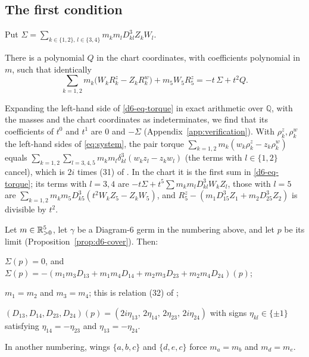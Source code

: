 \subsection{The first condition}

Put $\Sigma=\sum_{k\in\{1,2\},\,l\in\{3,4\}}m_km_lD_{kl}^3Z_kW_l$.

\begin{lemma}\label{d6-lem-torque}
There is a polynomial $Q$ in the chart coordinates, with coefficients polynomial in $m$, such
that identically
\begin{equation}\label{d6-eq-torque}
  \sum_{k=1,2}m_k\bigl(W_kR^z_k-Z_kR^w_k\bigr)+m_5W_5R^z_5=-t\,\Sigma+t^2Q.
\end{equation}
\end{lemma}
Expanding the left-hand side of \eqref{d6-eq-torque} in exact arithmetic over $\mathbb Q$, with
the masses and the chart coordinates as indeterminates, we find that its coefficients of $t^0$
and $t^1$ are $0$ and $-\Sigma$ (Appendix~\ref{app:verification}).
With $\rho^z_k,\rho^w_k$ the left-hand sides of \eqref{eq:system}, the pair torque
$\sum_{k=1,2}m_k(w_k\rho^z_k-z_k\rho^w_k)$ equals
$\sum_{k=1,2}\sum_{l=3,4,5}m_km_l\delta_{kl}^3(w_kz_l-z_kw_l)$ (the terms with $l\in\{1,2\}$
cancel), which is $2i$ times (31) of \cite[\S8.6]{AK}.  In the chart it is the first sum in
\eqref{d6-eq-torque}; its terms with $l=3,4$ are $-t\Sigma+t^5\sum m_km_lD_{kl}^3W_kZ_l$, those with
$l=5$ are $\sum_{k=1,2}m_km_5D_{k5}^3(t^2W_kZ_5-Z_kW_5)$, and
$R^z_5-(m_1D_{15}^3Z_1+m_2D_{25}^3Z_2)$ is divisible by $t^2$.

\begin{proposition}\label{prop:d6-first}
Let $m\in\mathbb{R}_{>0}^5$, let $\gamma$ be a Diagram-6 germ in the numbering above, and let $p$ be its
limit (Proposition~\ref{prop:d6-cover}).  Then:
\begin{romanlist}
  \item $\Sigma(p)=0$, and $\Sigma(p)=-(m_1m_3D_{13}+m_1m_4D_{14}+m_2m_3D_{23}+m_2m_4D_{24})(p)$;
  \item $m_1=m_2$ and $m_3=m_4$; this is relation (32) of \cite[\S8.6]{AK};
  \item $(D_{13},D_{14},D_{23},D_{24})(p)=(2i\eta_{13},\,2\eta_{14},\,2\eta_{23},\,2i\eta_{24})$
  with signs $\eta_{kl}\in\{\pm1\}$ satisfying $\eta_{14}=-\eta_{23}$ and $\eta_{13}=-\eta_{24}$.
\end{romanlist}
In another numbering, wings $\{a,b,c\}$ and $\{d,e,c\}$ force $m_a=m_b$ and $m_d=m_e$.
\end{proposition}

